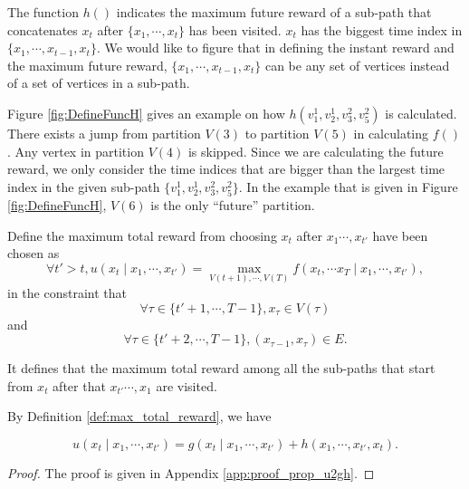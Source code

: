 The function $ h() $ indicates the maximum future reward of a sub-path that concatenates $ x_{t} $ after $ \{  x_{1} , \cdots, x_{t} \} $ has been visited. 
$  x_{t} $ has the biggest time index in $ \{  x_{1} , \cdots, x_{t-1} , x_{t} \} $.
We would like to figure that in defining the instant reward and the maximum future reward, $ \{  x_{1} , \cdots, x_{t-1} , x_{t} \} $ can be any set of vertices instead of a set of vertices in a sub-path.

Figure \ref{fig:DefineFuncH} gives an example on how $ h(v^{1}_{1}, v^{1}_{2}, v^{2}_{3}, v^{2}_{5}) $ is calculated.
There exists a jump from partition $ V(3) $ to partition $ V(5) $ in calculating $ f() $.
Any vertex in partition $ V(4) $ is skipped.
Since we are calculating the future reward, we only consider the time indices that are bigger than the largest time index in the given sub-path $ \{ v^{1}_{1}, v^{1}_{2}, v^{2}_{3}, v^{2}_{5}  \} $.
In the example that is given in Figure \ref{fig:DefineFuncH}, $ V(6) $ is the only ``future'' partition.

\begin{mydef}
\label{def:max_total_reward}
Define the maximum total reward from choosing $ x_{t} $ after $ x_{1} \cdots , x_{t'} $ have been chosen as 
\begin{equation}
\label{eq:def_p_0}
\forall t' > t, 
u(x_{t} \mid x_{1} , \cdots , x_{t'} ) = \max_{V(t+1), \cdots , V(T)} f(x_{t}, \cdots x_{T} \mid x_{1}, \cdots , x_{t'}),
\end{equation}
in the constraint that
\begin{equation}
\label{eq:def_p_0:constraint1}
\forall \tau \in \{ t'+1 , \cdots , T-1 \}, x_{ \tau } \in V( \tau )
\end{equation}
and
\begin{equation}
\label{eq:def_p_0:constraint2}
\forall \tau \in \{ t'+2, \cdots ,T-1 \}, ( x_{ \tau-1 }, x_{ \tau } ) \in E .
\end{equation}
\end{mydef}

It defines that the maximum total reward among all the sub-paths that start from $ x_{t} $ after that $ x_{t'} \cdots , x_{1} $ are visited.

By Definition \ref{def:max_total_reward}, we have
\begin{propty}
\label{prop:u2gh}
\begin{equation}
\label{eq:def_p}
u(x_{t} \mid x_{1} , \cdots , x_{t'} ) = g(x_{t} \mid x_{1} , \cdots , x_{t'} ) + h( x_{1} , \cdots, x_{t'}, x_{t} ).
\end{equation}
\begin{proof}
The proof is given in Appendix \ref{app:proof_prop_u2gh}.
\end{proof}
\end{propty}

